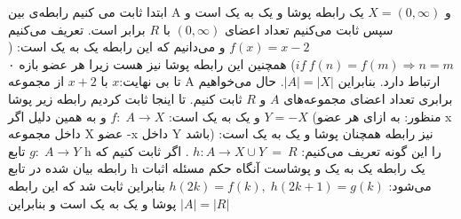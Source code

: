 \p
ابتدا ثابت می کنیم رابطه‌ی بین A و 
$X = (0, \infty)$ یک رابطه پوشا و یک به یک است و سپس ثابت می‌کنیم تعداد اعضای
 $(0, \infty)$
 با $R$ برابر است.
 		\newline
 		تعریف می‌کنیم $f(x) = x - 2$ و می‌دانیم که این رابطه یک به یک است: ($if \: f(n) = f(m) \Rightarrow n = m$)
 		\newline
 		همچنین این رابطه پوشا نیز هست زیرا هر عضو بازه ۰ تا بی نهایت:$x$ با $x + 2$ از مجموعه A ارتباط دارد.
 		بنابراین $|A| = |X|$.
 		\bigbreak
 		حال می‌خواهیم برابری تعداد اعضای مجموعه‌های $A$ و $R$ ثابت کنیم.
 		\newline
 		تا اینجا ثابت کردیم رابطه زیر پوشا و یک به یک است:
 		\bigbreak
 		$f:\; A \rightarrow X$
 		\bigbreak
 		و به همین دلیل اگر $Y = -X$ (منظور: به ازای هر عضو x داخل مجموعه X عضو -x داخل Y باشد) نیز رابطه همچنان پوشا و یک به یک است:
 		\bigbreak
 		$g:\; A \rightarrow Y$
 		\bigbreak
 		تابع h را این گونه تعریف می‌کنیم: $h: A \rightarrow X \cup Y \:= \: R$ . اگر ثابت کنیم که رابطه بیان شده در تابع h یک رابطه یک به یک و پوشاست آنگاه حکم مسئله اثبات می‌شود:
 		\bigbreak
 		$h(2k) = f(k),\; h(2k+1) = g(k)$
 		\bigbreak
 		بنابراین ثابت شد که این رابطه پوشا و یک به یک است و بنابراین $|A| = |R|$
 		\bigbreak	